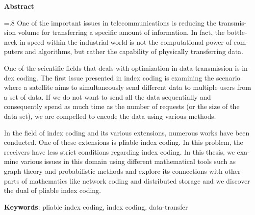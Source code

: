 


\pagestyle{empty}

\begin{latin}

\begin{center}
\textbf{Abstract}
\end{center}
\baselineskip=.8\baselineskip
One of the important issues in telecommunications is reducing the transmission volume for transferring a specific amount of information. In fact, the bottleneck in speed within the industrial world is not the computational power of computers and algorithms, but rather the capability of physically transferring data.

One of the scientific fields that deals with optimization in data transmission is index coding. The first issue presented in index coding is examining the scenario where a satellite aims to simultaneously send different data to multiple users from a set of data. If we do not want to send all the data sequentially and consequently spend as much time as the number of requests (or the size of the data set), we are compelled to encode the data using various methods.

In the field of index coding and its various extensions, numerous works have been conducted. One of these extensions is pliable index coding. In this problem, the receivers have less strict conditions regarding index coding. In this thesis, we examine various issues in this domain using different mathematical tools such as graph theory and probabilistic methods and explore its connections with other parts of mathematics like network coding and distributed storage and we discover the dual of pliable index coding.

\bigskip\noindent\textbf{Keywords}:
pliable index coding, index coding, data-transfer 

\end{latin}
